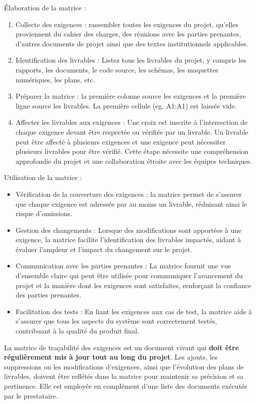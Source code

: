 \documentclass[a4paper,12pt]{article}
\begin{document}
Élaboration de la matrice :
\begin{enumerate}
\item Collecte des exigences : rassembler toutes les exigences du projet, qu'elles proviennent du cahier des charges, des réunions avec les parties prenantes, d'autres documents de projet ainsi que des textes institutionnels applicables.
\item Identification des livrables : Listez tous les livrables du projet, y compris les rapports, les documents, le code source, les schémas, les maquettes numériques, les plans, etc.
\item Préparer la matrice : la première colonne source les exigences et la première ligne source les livrables. La première cellule (eg. A1:A1) est laissée vide.
\item Affecter les livrables aux exigences : Une croix est inscrite à l'intersection de chaque exigence devant être respectée ou vérifiée par un livrable. Un livrable peut être affecté à plusieurs exigences et une exigence peut nécessiter plusieurs livrables pour être vérifié. Cette étape nécessite une compréhension approfondie du projet et une collaboration étroite avec les équipes techniques.
\end{enumerate}

Utilisation de la matrice :
\begin{itemize}
\item Vérification de la couverture des exigences : la matrice permet de s'assurer que chaque exigence est adressée par au moins un livrable, réduisant ainsi le risque d'omissions.
\item Gestion des changements : Lorsque des modifications sont apportées à une exigence, la matrice facilite l'identification des livrables impactés, aidant à évaluer l'ampleur et l'impact du changement sur le projet.
\item Communication avec les parties prenantes : La matrice fournit une vue d'ensemble claire qui peut être utilisée pour communiquer l'avancement du projet et la manière dont les exigences sont satisfaites, renforçant la confiance des parties prenantes.
\item Facilitation des tests : En liant les exigences aux cas de test, la matrice aide à s'assurer que tous les aspects du système sont correctement testés, contribuant à la qualité du produit final.
\end{itemize}

La matrice de traçabilité des exigences est un document vivant qui \textbf{doit être régulièrement mis à jour tout au long du projet}. Les ajouts, les suppressions ou les modifications d'exigences, ainsi que l'évolution des plans de livrables, doivent être reflétés dans la matrice pour maintenir sa précision et sa pertinence.
Elle est employée en complément d'une liste des documents exécutés par le prestataire.
\end{document}
